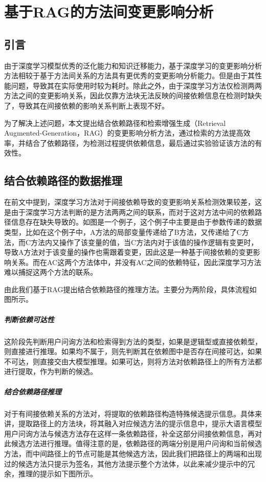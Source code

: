 \chapter{基于RAG的方法间变更影响分析}

\section{引言}

由于深度学习模型优秀的泛化能力和知识迁移能力，基于深度学习的变更影响分析方法相较于基于方法间关系的方法具有更优秀的变更影响分析能力。但是由于其性能问题，导致其在实际使用时较为耗时。除此之外，由于深度学习方法仅检测两两方法之间的变更影响关系，因此仅靠方法块无法反映的间接依赖信息在检测时缺失了，导致其在间接依赖的影响关系判断上表现不好。

为了解决上述问题，本文提出结合依赖路径和检索增强生成（Retrieval Augmented-Generation，RAG）的变更影响分析方法，通过检索的方法提高效率，并结合了依赖路径，为检测过程提供依赖信息，最后通过实验验证该方法的有效性。

\section{结合依赖路径的数据推理}

在前文中提到，深度学习方法对于间接依赖导致的变更影响关系检测效果较差，这是由于深度学习方法判断的是方法两两之间的联系，而对于这对方法中间的依赖路径信息存在缺失导致的。如图是一个例子，这个例子中主要是由于参数传递的数据类型，比如在这个例子中，A方法的局部变量传递给了B方法，又传递给了C方法，而C方法内又操作了该变量的值，当C方法内对于该值的操作逻辑有变更时，导致A方法对于该变量的操作也需跟着变更，因此这是一种基于间接依赖的变更影响关系。而在AC这两个方法体中，并没有AC之间的依赖特征，因此深度学习方法难以捕捉这两个方法的联系。



由此我们基于RAG提出结合依赖路径的推理方法。主要分为两阶段，具体流程如图所示。

\paragraph{判断依赖可达性} 这阶段先判断用户问询方法和检索得到方法的类型，如果是逻辑型或直接依赖型，则直接进行推理。如果均不属于，则先判断其在依赖图中是否存在间接可达，如果不可达，则直接交由大模型推理。如果可达，则将方法对依赖路径上的所有方法都进行提取，作为判断的候选。

\paragraph{结合依赖路径推理} 对于有间接依赖关系的方法对，将提取的依赖路径构造特殊候选提示信息。具体来讲，提取路径上的方法块，将其融入对应候选方法的提示信息中，提示大语言模型用户问询方法与候选方法存在这样一条依赖路径，补全这部分间接依赖信息，再对此候选方法进行推理。值得注意的是，依赖路径的两端分别是用户问询和当前候选方法，而中间路径上的节点可能是其他候选方法，因此我们把路径上的两端和出现过的候选方法只提示为签名，其他方法提示整个方法体，以此来减少提示中的冗余，推理的提示如下图所示。

